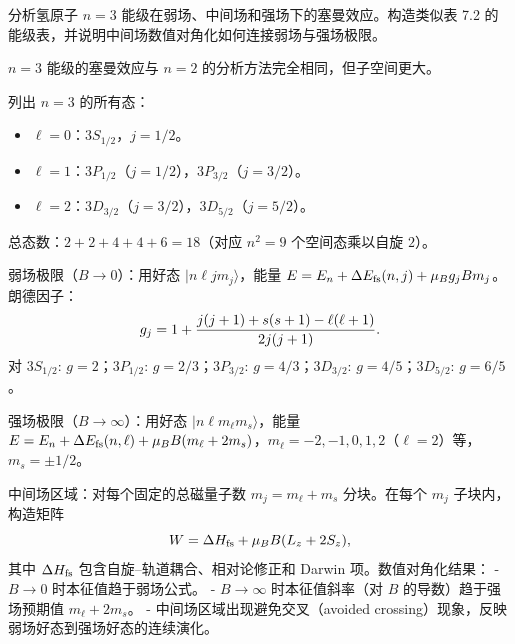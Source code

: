 \begin{question}
分析氢原子 $n=3$ 能级在弱场、中间场和强场下的塞曼效应。构造类似表 7.2 的能级表，并说明中间场数值对角化如何连接弱场与强场极限。
\end{question}
\begin{solution}
$n=3$ 能级的塞曼效应与 $n=2$ 的分析方法完全相同，但子空间更大。

列出 $n=3$ 的所有态：
\begin{itemize}
\item $\ell=0$：$3S_{1/2}$，$j=1/2$。
\item $\ell=1$：$3P_{1/2}$（$j=1/2$），$3P_{3/2}$（$j=3/2$）。
\item $\ell=2$：$3D_{3/2}$（$j=3/2$），$3D_{5/2}$（$j=5/2$）。
\end{itemize}
总态数：$2+2+4+4+6=18$（对应 $n^2=9$ 个空间态乘以自旋 $2$）。

弱场极限（$B\to0$）：用好态 $|n\ell j m_j\rangle$，能量 $E=E_n+\Delta E_{\rm fs}(n,j)+\mu_B g_j B m_j$。朗德因子：
\[
g_j=1+{j(j+1)+s(s+1)-\ell(\ell+1)\over2j(j+1)}.
\]
对 $3S_{1/2}$: $g=2$；$3P_{1/2}$: $g=2/3$；$3P_{3/2}$: $g=4/3$；$3D_{3/2}$: $g=4/5$；$3D_{5/2}$: $g=6/5$。

强场极限（$B\to\infty$）：用好态 $|n\ell m_\ell m_s\rangle$，能量 $E=E_n+\Delta E_{\rm fs}(n,\ell)+\mu_B B(m_\ell+2m_s)$，$m_\ell=-2,-1,0,1,2$（$\ell=2$）等，$m_s=\pm1/2$。

中间场区域：对每个固定的总磁量子数 $m_j=m_\ell+m_s$ 分块。在每个 $m_j$ 子块内，构造矩阵
\[
W = \Delta H_{\rm fs} + \mu_B B(L_z+2S_z),
\]
其中 $\Delta H_{\rm fs}$ 包含自旋--轨道耦合、相对论修正和 Darwin 项。数值对角化结果：
- $B\to0$ 时本征值趋于弱场公式。
- $B\to\infty$ 时本征值斜率（对 $B$ 的导数）趋于强场预期值 $m_\ell+2m_s$。
- 中间场区域出现避免交叉（avoided crossing）现象，反映弱场好态到强场好态的连续演化。
\end{solution}

